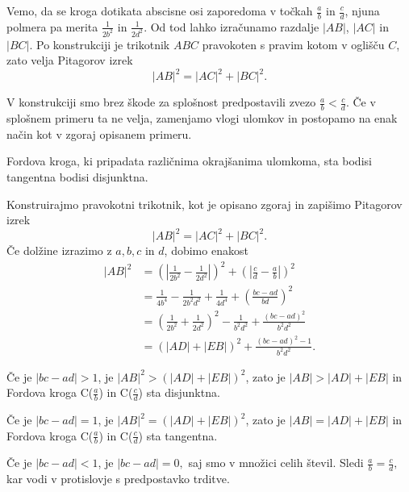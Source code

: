\documentclass[mat1]{fmfdelo}
\begin{document}
Vemo, da se kroga dotikata abscisne osi zaporedoma v točkah $\frac{a}{b}$ in $\frac{c}{d}$, njuna polmera pa merita $\frac{1}{2b^2}$ in $\frac{1}{2d^2}$. Od tod lahko izračunamo razdalje $|AB|$, $|AC|$ in $|BC|$.
Po konstrukciji je trikotnik $ABC$ pravokoten s pravim kotom v oglišču $C$, zato velja Pitagorov izrek
\[ |AB|^2 = |AC|^2 + |BC|^2. \]

\begin{opomba}
V konstrukciji smo brez škode za splošnost predpostavili zvezo $\frac{a}{b} < \frac{c}{d}$. Če v splošnem primeru ta ne velja, zamenjamo vlogi ulomkov in postopamo na enak način kot v zgoraj opisanem primeru.
\end{opomba}
%

\begin{trditev}
\label{trd:FordDisjTang}
Fordova kroga, ki pripadata različnima okrajšanima ulomkoma, sta bodisi tangentna bodisi disjunktna.
\end{trditev}

\begin{dokaz}
Konstruirajmo pravokotni trikotnik, kot je opisano zgoraj in zapišimo Pitagorov izrek \[ |AB|^2 = |AC|^2 + |BC|^2. \]
Če dolžine izrazimo z $a, b, c$ in $d$, dobimo enakost
%
\begin{align*}
|AB|^2 
  &= \left ( \left| \frac{1}{2b^2} - \frac{1}{2d^2} \right| \right)^2  + \left ( \left| \frac{c}{d} - \frac{a}{b} \right| \right )^2 \\ 
  &= \frac{1}{4b^4} - \frac{1}{2b^2d^2} + \frac{1}{4d^4} + \left (\frac{bc-ad}{bd} \right )^2 \\
  &= \left (\frac{1}{2b^2} + \frac{1}{2d^2} \right )^2 - \frac{1}{b^2d^2} + \frac{(bc-ad)^2}{b^2d^2} \\
  &= (|AD| + |EB|)^2 + \frac{(bc-ad)^2-1}{b^2d^2}.
\end{align*}

Če je $|bc-ad|>1$, je $|AB|^2 > (|AD| + |EB|)^2$, zato je $|AB| > |AD| + |EB|$ in Fordova kroga C($\frac{a}{b}$) in C($\frac{c}{d}$) sta disjunktna.

Če je $|bc-ad|=1$, je $|AB|^2 = (|AD| + |EB|)^2$, zato je $|AB| = |AD| + |EB|$ in Fordova kroga C($\frac{a}{b}$) in C($\frac{c}{d}$) sta tangentna.

Če je $|bc-ad|<1$, je $|bc-ad|=0,$ saj smo v množici celih števil. Sledi $\frac{a}{b} = \frac{c}{d},$ kar vodi v protislovje s predpostavko trditve.
\end{dokaz}

\end{document}
